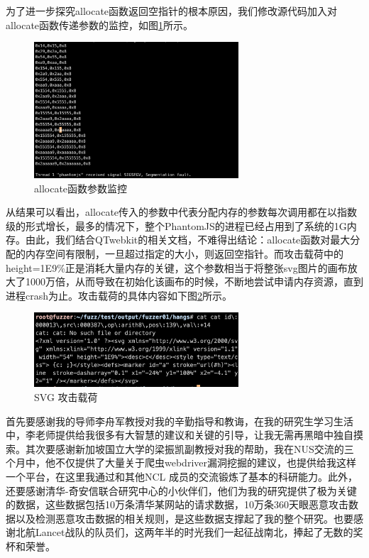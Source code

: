\documentclass[doctor,privacy,twoside]{buaa_mac}
\begin{document}
 为了进一步探究allocate函数返回空指针的根本原因，我们修改源代码加入对allocate函数传递参数的监控，如图\ref{fig:allocate}所示。
 
\centerline{}
\begin{figure}[!h]
  \centering
  \includegraphics[width=0.68\textwidth]{images/gdb_parameter.png}
  \caption{allocate函数参数监控}
  \label{fig:allocate}
\end{figure}


  
从结果可以看出，allocate传入的参数中代表分配内存的参数每次调用都在以指数级的形式增长，最多的情况下，整个PhantomJS的进程已经占用到了系统的1G内存。由此，我们结合QTwebkit的相关文档，不难得出结论：allocate函数对最大分配的内存空间有限制，一旦超过指定的大小，则返回空指针。而攻击载荷中的height=1E9\%正是消耗大量内存的关键，这个参数相当于将整张svg图片的画布放大了1000万倍，从而导致在初始化该画布的时候，不断地尝试申请内存资源，直到进程crash为止。攻击载荷的具体内容如下图\ref{fig:svg-payload}所示。

\centerline{}
\begin{figure}[!h]
  \centering
  \includegraphics[width=0.68\textwidth]{images/svg_payload.png}
  \caption{SVG 攻击载荷}
  \label{fig:svg-payload}
\end{figure}





\achievement


\acknowledgments

首先要感谢我的导师李舟军教授对我的辛勤指导和教诲，在我的研究生学习生活中，李老师提供给我很多有大智慧的建议和关键的引导，让我无需再黑暗中独自摸索。其次要感谢新加坡国立大学的梁振凯副教授对我的帮助，我在NUS交流的三个月中，他不仅提供了大量关于爬虫webdriver漏洞挖掘的建议，也提供给我这样一个平台，在这里我通过和其他NCL 成员的交流锻炼了基本的科研能力。此外，还要感谢清华-奇安信联合研究中心的小伙伴们，他们为我的研究提供了极为关键的数据，这些数据包括10万条清华某网站的请求数据，10万条360天眼恶意攻击数据以及检测恶意攻击数据的相关规则，是这些数据支撑起了我的整个研究。也要感谢北航Lancet战队的队员们，这两年半的时光我们一起征战南北，捧起了无数的奖杯和荣誉。
\end{document}
